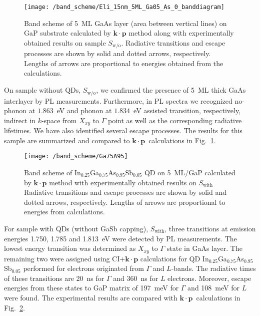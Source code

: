 {{{\begin{figure}
	\centering
	\texttt{[image: /band\_scheme/Eli\_15nm\_5ML\_Ga05\_As\_0\_banddiagram]} %
	\caption{Band scheme of 5~ML GaAs layer (area between vertical lines) on GaP substrate calculated by $\mathbf{k \cdot p}$ method along with experimentally obtained results on sample $S_\mathrm{w/o}$. Radiative transitions and escape processes are shown by solid and dotted arrows, respectively. Lengths of arrows are proportional to energies obtained from the calculations.}
	\label{fig:Band_scheme_wo}
\end{figure}
%
On sample without QDs, $S_\mathrm{w/o}$, we confirmed the presence of 5~ML thick GaAs interlayer by PL measurements. Furthermore, in PL spectra we recognized no-phonon at $1.863$~eV and phonon at $1.834$~eV assisted transition, respectively, indirect in $k$-space from $X_{xy}$ to $\Gamma$ point as well as the corresponding radiative lifetimes. We have also identified several escape processes. The results for this sample are summarized and compared to $\mathbf{k \cdot p}$~calculations in Fig.~\ref{fig:Band_scheme_wo}.
%


\begin{figure}
	\centering
	\texttt{[image: /band\_scheme/Ga75A95]}%
	\caption{Band scheme of In$_{0.25}$Ga$_{0.75}$As$_{0.95}$Sb$_{0.05}$ QD on 5~ML/GaP calculated by $\mathbf{k \cdot p}$ method with experimentally obtained results on $S_\mathrm{with}$Radiative transitions and escape processes are shown by solid and dotted arrows, respectively. Lengths of arrows are proportional to energies from calculations.
	}
	\label{fig:Band_scheme_with}
\end{figure}
%
For sample with QDs (without GaSb capping), $S_\mathrm{with}$, three transitions at emission energies 1.750, 1.785 and 1.813~eV were detected by PL measurements. The lowest energy transition was determined as $X_{xy}$ to $\Gamma$ state in GaAs layer. The remaining two were assigned using CI+$\mathbf{k \cdot p}$ calculations for QD In$_{0.25}$Ga$_{0.75}$As$_{0.95}$Sb$_{0.05}$ performed for electrons originated from $\Gamma$ and $L$-bands. The radiative times of these transitions are 20~ns for $\Gamma$ and 360~ns for $L$ electrons. Moreover, escape energies from these states to GaP matrix of 197~meV for $\Gamma$ and 108~meV for $L$ were found. The experimental results are compared with $\mathbf{k \cdot p}$~calculations in Fig.~\ref{fig:Band_scheme_with}.
%


}}}
